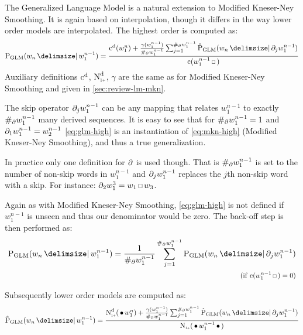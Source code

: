 The Generalized Language Model is a natural extension to Modified Kneser-Ney
Smoothing.
It is again based on interpolation, though it differs in the way lower order
models are interpolated.
The highest order is computed as:
\begin{equation}
  \label{eq:glm-high}
  \ProbGLM{w_n}{w_1^{n-1}} =
    \frac{\DiscountedCount(w_1^n) + \frac{\gamma(w_1^{n-1})}{\NumSkpOp{w_1^{n-1}}}
                                    \sum_{j=1}^{\NumSkpOp{w_1^{n-1}}} \ProbGLM*{w_n}{\SkpOp[j]{w_1^{n-1}}}}
         {\Count(w_1^{n-1} \Skp)}
\end{equation}
Auxiliary definitions $\DiscountedCount$, $\DiscountedCount*$, $\gamma$ are the
same as for Modified Kneser-Ney Smoothing and given in \cref{sec:review-lm-mkn}.

The skip operator $\SkpOp[j]{w_1^{n-1}}$ can be any mapping that relates
$w_1^{n-1}$ to exactly $\NumSkpOp{w_1^{n-1}}$ many derived sequences.
It is easy to see that for $\NumSkpOp{w_1^{n-1}} = 1$ and
$\SkpOp[1]{w_1^{n-1}} = w_2^{n-1}$ \cref{eq:glm-high} is an
instantiation of \cref{eq:mkn-high} (Modified Kneser-Ney Smoothing), and thus
a true generalization.

In practice only one definition for $\SkpOp$ is used though.
That is $\NumSkpOp{w_1^{n-1}}$ is set to the number of non-skip words in
$w_1^{n-1}$ and $\SkpOp[j]{w_1^{n-1}}$ replaces the $j$th non-skip word with
a skip.
For instance: $\SkpOp[2]{w_1^3} = w_1 \Skp w_3$.

Again as with Modified Kneser-Ney Smoothing, \cref{eq:glm-high} is not
defined if $w_1^{n-1}$ is unseen and thus our denominator would be zero.
The back-off step is then performed as:
\begin{equation}
  \label{eq:glm-backoff}
  \begin{split}
    \ProbGLM{w_n}{w_1^{n-1}} = \frac{1}{\NumSkpOp{w_1^{n-1}}}
                               \sum_{j=1}^{\NumSkpOp{w_1^{n-1}}} \ProbGLM{w_n}{\SkpOp[j]{w_1^{n-1}}} \\
      \hfill \Condition{\Count(w_1^{n-1} \Skp) = 0}
  \end{split}
\end{equation}

Subsequently lower order models are computed as:
\begin{equation}
  \label{eq:glm-low}
  \ProbGLM*{w_n}{w_1^{n-1}} =
    \frac{\DiscountedCount*(\WSkp w_1^n) + \frac{\gamma(w_1^{n-1})}{\NumSkpOp{w_1^{n-1}}}
                                     \sum_{j=1}^{\NumSkpOp{w_1^{n-1}}} \ProbGLM*{w_n}{\SkpOp[j]{w_1^{n-1}}}}
         {\ContCountIp(\WSkp w_1^{n-1} \WSkp)}
\end{equation}

